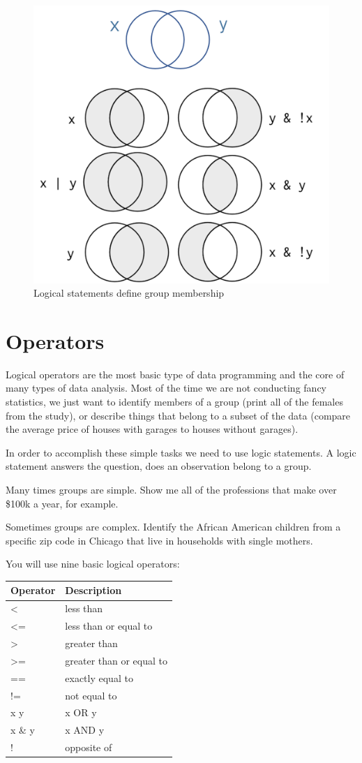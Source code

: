 \documentclass[]{book}
\theoremstyle{definition}
\theoremstyle{definition}
\theoremstyle{definition}
\theoremstyle{remark}
\begin{document}
\begin{figure}

{\centering \includegraphics[width=0.7\linewidth]{figures/set_theory} 

}

\caption{Logical statements define group membership}\label{fig:unnamed-chunk-83}
\end{figure}

\hypertarget{operators}{%
\section{Operators}\label{operators}}

Logical operators are the most basic type of data programming and the
core of many types of data analysis. Most of the time we are not
conducting fancy statistics, we just want to identify members of a group
(print all of the females from the study), or describe things that
belong to a subset of the data (compare the average price of houses with
garages to houses without garages).

In order to accomplish these simple tasks we need to use logic
statements. A logic statement answers the question, does an observation
belong to a group.

Many times groups are simple. Show me all of the professions that make
over \$100k a year, for example.

Sometimes groups are complex. Identify the African American children
from a specific zip code in Chicago that live in households with single
mothers.

You will use nine basic logical operators:

\begin{longtable}[]{@{}ll@{}}
\toprule
Operator & Description\tabularnewline
\midrule
\endhead
\textless{} & less than\tabularnewline
\textless{}= & less than or equal to\tabularnewline
\textgreater{} & greater than\tabularnewline
\textgreater{}= & greater than or equal to\tabularnewline
== & exactly equal to\tabularnewline
!= & not equal to\tabularnewline
x \textbar{} y & x OR y\tabularnewline
x \& y & x AND y\tabularnewline
! & opposite of\tabularnewline
\bottomrule
\end{longtable}
\end{document}
